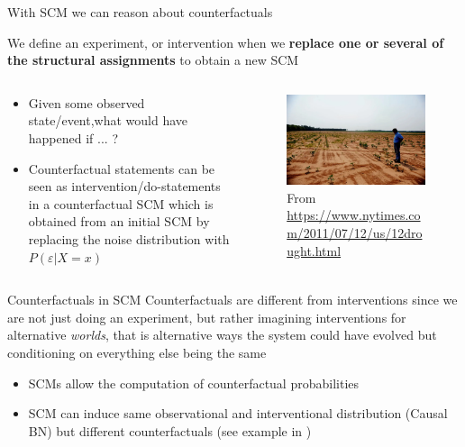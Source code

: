 \documentclass{beamer}
\begin{document}
\begin{frame}{With SCM we can reason about counterfactuals}
\begin{block}{}
  We define an experiment, or intervention when
  we \textbf{replace one or several of the structural assignments}
to obtain a new SCM
    \end{block}
  \begin{columns}
\begin{column}{0.5\textwidth}
  \begin{itemize}

    \item<1-> Given some observed state/event,what would have happened if ... ? 
    \item<2-> Counterfactual statements can be seen as intervention/do-statements in
			a counterfactual SCM which is obtained from an initial SCM by replacing the
			noise distribution with $P(\varepsilon | X = x)$
    \end{itemize}
\end{column}
\begin{column}{0.5\textwidth}
  \begin{figure}
  \includegraphics[width=\textwidth]{cotton-drought}
    \caption{From \url{https://www.nytimes.com/2011/07/12/us/12drought.html}}
  \end{figure}
\end{column}
  \end{columns}
\end{frame}


\begin{frame}{Counterfactuals in SCM}
Counterfactuals are  different from interventions since we are not just doing an experiment,
      but rather imagining interventions for alternative \emph{worlds}, that is
      alternative ways the system could have evolved but conditioning on everything
      else being the same
	\begin{itemize}
	  \item SCMs allow the computation of counterfactual probabilities

	  \item SCM can induce same observational and interventional distribution (Causal BN)
	    but different counterfactuals (see example in \cite{peters2017elements}) 
	\end{itemize}

\end{frame}
\end{document}
